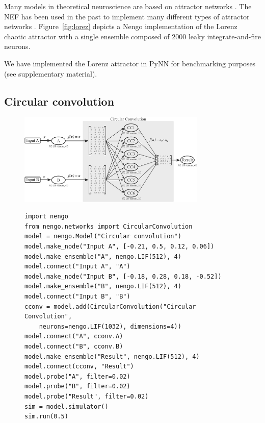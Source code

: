 \documentclass{frontiersSCNS}
\begin{document}
Many models in theoretical neuroscience
are based on attractor networks \cite{TODO}. %
The NEF has been used in the past
to implement many different types of
attractor networks \cite{TODO}.
Figure~\ref{fig:lorez} depicts
a Nengo implementation of the Lorenz chaotic attractor
with a single ensemble
composed of 2000 leaky integrate-and-fire neurons.

We have implemented the Lorenz attractor
in PyNN for benchmarking purposes
(see supplementary material).

\subsection{Circular convolution} \label{sec:cconv}

\begin{figure}
\begin{center}
  \includegraphics[width=0.8\textwidth]{cconv}
  \begin{minipage}{0.46\textwidth}
    \begin{lstlisting}[basicstyle={\footnotesize\ttfamily}]
import nengo
from nengo.networks import CircularConvolution
model = nengo.Model("Circular convolution")
model.make_node("Input A", [-0.21, 0.5, 0.12, 0.06])
model.make_ensemble("A", nengo.LIF(512), 4)
model.connect("Input A", "A")
model.make_node("Input B", [-0.18, 0.28, 0.18, -0.52])
model.make_ensemble("B", nengo.LIF(512), 4)
model.connect("Input B", "B")
cconv = model.add(CircularConvolution("Circular Convolution",
    neurons=nengo.LIF(1032), dimensions=4))
model.connect("A", cconv.A)
model.connect("B", cconv.B)
model.make_ensemble("Result", nengo.LIF(512), 4)
model.connect(cconv, "Result")
model.probe("A", filter=0.02)
model.probe("B", filter=0.02)
model.probe("Result", filter=0.02)
sim = model.simulator()
sim.run(0.5)
    \end{lstlisting}
  \end{minipage}
  \begin{minipage}{0.46\textwidth}

\end{minipage}
\end{center}
\end{figure}
\end{document}
